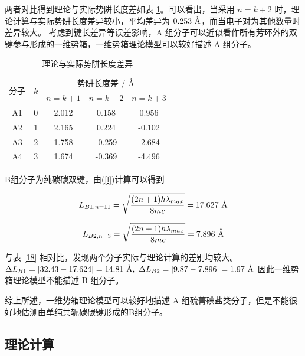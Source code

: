 \documentclass[cn,hazy,pku,12pt,normal,math=newtx,cite=super]{elegantnote}
\begin{document}
两者对比得到理论与实际势阱长度差如表 \ref{19}。可以看出，当采用 $n=k+2$ 时，理论计算与实际势阱长度差异较小，平均差异为 $\rm 0.253\ \mathring{A}$，而当电子对为其他数量时差异较大。
考虑到键长差异等误差影响，A 组分子可以近似看作所有芳环外的双键参与形成的一维势箱，一维势箱理论模型可以较好描述 A 组分子。


\begin{table}[h]
    \centering
    \caption{理论与实际势阱长度差异}
    \label{19}
    \begin{tabular}{ccccc}
    \hline
    \multicolumn{1}{l}{\multirow{2}{*}{分子}} & \multicolumn{1}{l}{\multirow{2}{*}{$k$}} & \multicolumn{3}{c}{势阱长度差 /$\rm \ \mathring{A} $} \\
    \multicolumn{1}{l}{}                    & \multicolumn{1}{l}{}                     & $n=k+1$     & $n=k+2$    & $n=k+3$    \\ \hline
    A1 & 0 & 2.012 & 0.158  & 0.956  \\
    A2 & 1 & 2.165 & 0.224  & -0.102 \\
    A3 & 2 & 1.758 & -0.259 & -2.684 \\
    A4 & 3 & 1.674 & -0.369 & -4.496 \\ \hline
    \end{tabular}
\end{table}

\newpage

B组分子为纯碳碳双键，由(\ref{l})计算可以得到

\begin{equation}
    L_{B1, n=11} =  \sqrt{\frac{(2n + 1)h\lambda_{max}}{8mc}} = 17.627{\rm \ \mathring{A}}
\end{equation}

\begin{equation}
    L_{B2, n=3} =  \sqrt{\frac{(2n + 1)h\lambda_{max}}{8mc}} = 7.896{\rm \ \mathring{A}}
\end{equation}

与表 \ref{18} 相对比，发现两个分子实际与理论计算的差别均较大。$\Delta L_{B1} = |32.43 - 17.624| = 14.81{\rm \ \mathring{A}},\ \Delta L_{B2} = |9.87 - 7.896|  = 1.97{\rm \ \mathring{A}} $
因此一维势箱理论模型不能描述 B 组分子。

综上所述，一维势箱理论模型可以较好地描述 A 组硫菁碘盐类分子，但是不能很好地估测由单纯共轭碳碳键形成的B组分子。

\subsection{理论计算}
\end{document}
